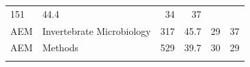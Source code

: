 \documentclass[11pt,]{article}
\begin{document}
\begin{longtable}[]{@{}llrrrr@{}}
\begin{minipage}[t]{0.04\columnwidth}
151\strut
\end{minipage} & \begin{minipage}[t]{0.08\columnwidth}\raggedleft\strut
44.4\strut
\end{minipage} & \begin{minipage}[t]{0.11\columnwidth}\raggedleft\strut
34\strut
\end{minipage} & \begin{minipage}[t]{0.11\columnwidth}\raggedleft\strut
37\strut
\end{minipage}\tabularnewline
\begin{minipage}[t]{0.06\columnwidth}\raggedright\strut
AEM\strut
\end{minipage} & \begin{minipage}[t]{0.43\columnwidth}\raggedright\strut
Invertebrate Microbiology\strut
\end{minipage} & \begin{minipage}[t]{0.04\columnwidth}\raggedleft\strut
317\strut
\end{minipage} & \begin{minipage}[t]{0.08\columnwidth}\raggedleft\strut
45.7\strut
\end{minipage} & \begin{minipage}[t]{0.11\columnwidth}\raggedleft\strut
29\strut
\end{minipage} & \begin{minipage}[t]{0.11\columnwidth}\raggedleft\strut
37\strut
\end{minipage}\tabularnewline
\begin{minipage}[t]{0.06\columnwidth}\raggedright\strut
AEM\strut
\end{minipage} & \begin{minipage}[t]{0.43\columnwidth}\raggedright\strut
Methods\strut
\end{minipage} & \begin{minipage}[t]{0.04\columnwidth}\raggedleft\strut
529\strut
\end{minipage} & \begin{minipage}[t]{0.08\columnwidth}\raggedleft\strut
39.7\strut
\end{minipage} & \begin{minipage}[t]{0.11\columnwidth}\raggedleft\strut
30\strut
\end{minipage} & \begin{minipage}[t]{0.11\columnwidth}\raggedleft\strut
29\strut
\end{minipage}\tabularnewline
\begin{minipage}[t]{0.06\columnwidth}\raggedright\strut

\end{minipage}
\end{longtable}
\end{document}
